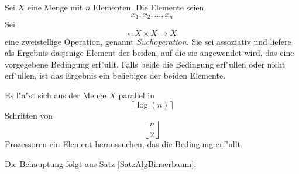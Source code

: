 
\begin{korollar}
\label{SatzAlgSuche}            %
    Sei $X$ eine Menge mit $n$ Elementen. Die Elemente seien
    \[ x_1, x_2, \ldots, x_n \]
    Sei \[ \circ : X \times X \rightarrow X \] eine zweistellige Operation,
    genannt {\em Suchoperation}.
    Sie sei assoziativ und liefere als Ergebnis dasjenige
    Element der beiden, auf
    die sie angewendet wird, das eine vorgegebene Bedingung erf"ullt.
    Falls beide die Bedingung erf"ullen oder nicht erf"ullen, ist das
    Ergebnis ein beliebiges der beiden Elemente.

    Es l"a"st sich aus der Menge $X$ parallel in
    \[ \left\lceil \log(n) \right\rceil \] Schritten von
    \[ \left\lfloor \frac{n}{2} \right\rfloor \] Prozessoren ein
    Element heraussuchen, das die Bedingung erf"ullt.
\end{korollar}
\begin{beweis}
    Die Behauptung folgt aus Satz \ref{SatzAlgBinaerbaum}.
\end{beweis}

